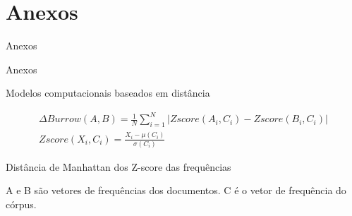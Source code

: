 \section{Anexos}

\begin{frame}{Anexos}
	\begin{alertblock}{Anexos}
	\end{alertblock}
\end{frame}


\begin{frame}{Modelos computacionais baseados em distância}
\selectFont
\begin{tcolorbox}[colback=blue!5!white,colframe=blue!75!black,valign=center,title=Regra $\Delta$ de Burrows ]\selectFont
	\begin{equation}
	\begin{aligned}
	\Delta Burrow \left ( A, B \right) = \frac{1}{N}\sum_{i=1}^{N}\left | Zscore(A_i,C_i) - Zscore(B_i,C_i) \right |
	\\
	Zscore(X_i,C_i)= \frac{X_i - \mu (C_i) }{\sigma(C_i)}
	\end{aligned}
	\label{eq:deltaBorrow}
	\end{equation}
	
	Distância de Manhattan dos Z-score das frequências         
\end{tcolorbox}

A e B são vetores de frequências dos documentos. C é o vetor de frequência do córpus.

\end{frame}

